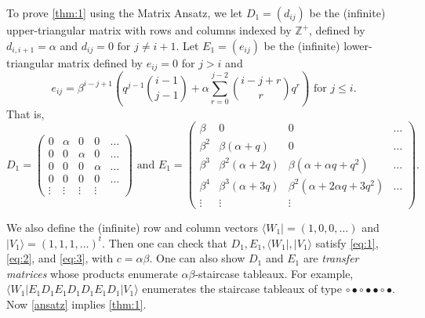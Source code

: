 \documentclass[11pt]{amsart}
\theoremstyle{definition}
\theoremstyle{remark}
\begin{document}
To prove \cref{thm:1} using the Matrix Ansatz, we let 
 $D_1=(d_{ij})$ be the 
(infinite) upper-triangular matrix with rows and columns 
indexed by $\mathbb{Z}^+$,
defined by 
$	d_{i,i+1} =\alpha$ and  $d_{ij}=0 \text{ for }j\neq i+1.$
Let 
 $E_1=(e_{ij})$ be the (infinite) lower-triangular matrix defined by 
	 $e_{ij}=0$ for $j>i$ and 
\begin{equation*}
e_{ij}=\beta^{i-j+1}(q^{j-1} {i-1 \choose j-1} + \alpha \sum_{r=0}^{j-2} {i-j+r \choose r} q^r)
	\text{ for }j\leq i.
\end{equation*}  
That is, %
\begin{equation*}
D_1=\left( \begin{array}{ccccc}
0 & \alpha & 0 & 0 & \dots \\
0 & 0 & \alpha & 0 & \dots \\
0 & 0 & 0 & \alpha & \dots \\
0 & 0 & 0 & 0 & \dots \\
\vdots & \vdots & \vdots & \vdots &
\end{array} \right)
	\text{ and }
E_1 =  \left( \begin{array}{ccccc}
\beta & 0 & 0 &   \dots \\
	\beta^2 & \beta(\alpha+q) & 0 &  \dots \\
	\beta^3 & \beta^2(\alpha+2 q) &  \beta (\alpha+\alpha q+ q^2) &
\dots \\
 \beta^4  & \beta^3 (\alpha +3 q) &
	\beta^2(\alpha+2\alpha q+3 q^2)  &  \dots \\
\vdots & \vdots & \vdots & 
\end{array} \right). 
\end{equation*}

\normalsize{
	We also define the (infinite) row and column vectors
$\langle W_1|=(1,0,0,\dots )$ and  $|V_1 \rangle= (1,1,1,\dots )^t$.
Then one can check that 
$D_1, E_1, \langle W_1|, |V_1\rangle$ satisfy  
\eqref{eq:1}, \eqref{eq:2}, and \eqref{eq:3},
with $c = \alpha \beta$.
One can also show
$D_1$ and $E_1$ are \emph{transfer matrices} whose products enumerate
$\alpha \beta$-staircase tableaux. 
For example, 
$\langle W_1|E_1D_1E_1D_1D_1E_1D_1|V_1\rangle$  enumerates the staircase tableaux
of type 
 $\circ \bullet \circ \bullet \bullet \circ \bullet$.
Now \cref{ansatz} implies \cref{thm:1}.
}
\end{document}
